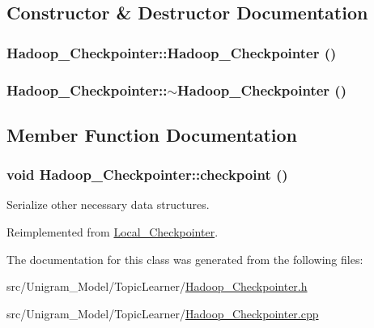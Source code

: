 \subsection{Constructor \& Destructor Documentation}
\hypertarget{class_hadoop___checkpointer_a977443dc2a2b2f9541a1773ece3edda4}{
\subsubsection[{Hadoop\_\-Checkpointer}]{\setlength{\rightskip}{0pt plus 5cm}Hadoop\_\-Checkpointer::Hadoop\_\-Checkpointer ()}}
\label{class_hadoop___checkpointer_a977443dc2a2b2f9541a1773ece3edda4}
\hypertarget{class_hadoop___checkpointer_a173ccac3537fb73699d8746fb57c4ec6}{
\subsubsection[{$\sim$Hadoop\_\-Checkpointer}]{\setlength{\rightskip}{0pt plus 5cm}Hadoop\_\-Checkpointer::$\sim$Hadoop\_\-Checkpointer ()}}
\label{class_hadoop___checkpointer_a173ccac3537fb73699d8746fb57c4ec6}


\subsection{Member Function Documentation}
\hypertarget{class_hadoop___checkpointer_acf19b7cb85d84a51584bd06de37e8fee}{
\subsubsection[{checkpoint}]{\setlength{\rightskip}{0pt plus 5cm}void Hadoop\_\-Checkpointer::checkpoint ()}}
\label{class_hadoop___checkpointer_acf19b7cb85d84a51584bd06de37e8fee}


Serialize other necessary data structures. 



Reimplemented from \hyperlink{class_local___checkpointer_aa271d3a80545d6a962c959c82fa7b7c7}{Local\_\-Checkpointer}.



The documentation for this class was generated from the following files:\begin{DoxyCompactItemize}
\item 
src/Unigram\_\-Model/TopicLearner/\hyperlink{_hadoop___checkpointer_8h}{Hadoop\_\-Checkpointer.h}\item 
src/Unigram\_\-Model/TopicLearner/\hyperlink{_hadoop___checkpointer_8cpp}{Hadoop\_\-Checkpointer.cpp}\end{DoxyCompactItemize}
